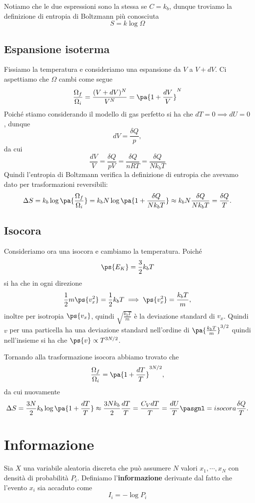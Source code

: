 \noindent Notiamo che le due espressioni sono la stessa se $C=k_b$, dunque troviamo la definizione di entropia di Boltzmann pi\`u conosciuta
\[\boxed{S=k\log \Omega}\]

\subsection{Espansione isoterma}
Fissiamo la temperatura e consideriamo una espansione da $V$ a $V+dV$. Ci aspettiamo che $\Omega$ cambi come segue
\[\frac{\Omega_f}{\Omega_i}=\frac{(V+dV)^N}{V^N}=\pa{1+\frac{dV}V}^N\]
Poich\'e stiamo considerando il modello di gas perfetto si ha che $dT=0\implies dU=0$, dunque
\[dV=\frac{\delta Q}p,\]
da cui
\[\frac{dV}V=\frac{\delta Q}{pV}=\frac{\delta Q}{nRT}=\frac{\delta Q}{Nk_b T}\]
Quindi l'entropia di Boltzmann verifica la definizione di entropia che avevamo dato per trasformazioni reversibili:
\[\Delta S=k_b\log\pa{\frac{\Omega_f}{\Omega_i}}=k_b N\log\pa{1+\frac{\delta Q}{Nk_b T}}\approx k_bN\frac{\delta Q}{Nk_bT}=\frac{\delta Q}T.\]

\subsection{Isocora}
Consideriamo ora una isocora e cambiamo la temperatura. Poich\'e
\[\ps{E_K}=\frac32k_bT\]
si ha che in ogni direzione 
\[\frac12m\ps{v_x^2}=\frac12 k_bT\implies \ps{v_x^2}=\frac{k_bT}m,\]
inoltre per isotropia $\ps{v_x}$, quindi $\sqrt{\frac{k_bT}m}$ \`e la deviazione standard di $v_x$.
Quindi $v$ per una particella ha una deviazione standard nell'ordine di $\pa{\frac{k_bT}m}^{3/2}$ quindi nell'insieme si ha che $\ps{v}\propto T^{3N/2}$.
\medskip

\noindent
Tornando alla trasformazione isocora abbiamo trovato che 
\[\frac{\Omega_f}{\Omega_i}=\pa{1+\frac{dT}T}^{3N/2},\]
da cui nuovamente
\[\Delta S=\frac{3N}2k_b\log\pa{1+\frac{dT}T}\approx \frac{3Nk_b}2\frac{dT}T=\frac{C_VdT}T=\frac{dU}T\pasgnl={isocora}\frac{\delta Q}T.\]



\section{Informazione}
\begin{definition}[Informazione]
Sia $X$ una variabile aleatoria discreta che pu\`o assumere $N$ valori $x_1,\cdots, x_N$ con densit\`a di probabilit\`a $P_i$. 
Definiamo l'\textbf{informazione} derivante dal fatto che l'evento $x_i$ sia accaduto come
\[I_i=-\log P_i\]
\end{definition}

